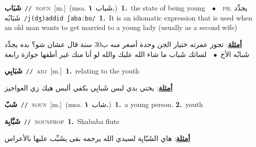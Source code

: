 \documentclass[10pt,a4paper,twoside]{article} %
\begin{document}
\begin{multicols}{2}
{\setlength\topsep{0pt}\textbf{\foreignlanguage{arabic}{شَبَاب}}\ {\color{gray}\texttt{//}\color{black}}\ \textsc{noun}\ [m.]\ \color{gray}(msa. \foreignlanguage{arabic}{شَباب}~\foreignlanguage{arabic}{\textbf{١.}})\color{black}\ \textbf{1.}~the state of being young\ \ $\bullet$\ \ \textsc{ph.} \color{gray} \foreignlanguage{arabic}{يجدِّد شَبَابُه}\color{black}\ {\color{gray}\texttt{/{\sffamily j(dʒ)addid ʃabaːbo}/}\color{black}}\ \textbf{1.}~It is an idiomatic expression that is used when an old man wants to get married to a young lady (usually as a second wife)\  \begin{flushright}\color{gray}\foreignlanguage{arabic}{\textbf{\underline{\foreignlanguage{arabic}{أمثلة}}}: تجوز عمرته ختيار الجن وحدة أصغر منه ب30 سنة قال عشان شو؟ بده يجدِّد شَبابُه الأخ\ $\bullet$\ \  لساتك شَباب ما شاء الله عليك والله لو أنا منك غير أطقها جوازة رابعة}\end{flushright}\color{black}} \vspace{2mm}

{\setlength\topsep{0pt}\textbf{\foreignlanguage{arabic}{شَبَابِي}}\ {\color{gray}\texttt{//}\color{black}}\ \textsc{adj}\ [m.]\ \textbf{1.}~relating to the youth\  \begin{flushright}\color{gray}\foreignlanguage{arabic}{\textbf{\underline{\foreignlanguage{arabic}{أمثلة}}}: يختي بدي لبس شَبابِي بكفي ألبس هيك زي العواجيز}\end{flushright}\color{black}} \vspace{2mm}

{\setlength\topsep{0pt}\textbf{\foreignlanguage{arabic}{شَبّ}}\ {\color{gray}\texttt{//}\color{black}}\ \textsc{noun}\ [m.]\ \color{gray}(msa. \foreignlanguage{arabic}{شاب}~\foreignlanguage{arabic}{\textbf{١.}})\color{black}\ \textbf{1.}~a young person.  \textbf{2.}~youth\ } \vspace{2mm}

{\setlength\topsep{0pt}\textbf{\foreignlanguage{arabic}{شَبَّابِة}}\ {\color{gray}\texttt{//}\color{black}}\ \textsc{noun\textunderscore prop}\ \textbf{1.}~Shababa flute\  \begin{flushright}\color{gray}\foreignlanguage{arabic}{\textbf{\underline{\foreignlanguage{arabic}{أمثلة}}}: هاي الشَبّابِة لسيدي الله يرحمه بقى  يشَبِّب عليها بالأعراس}\end{flushright}\color{black}} \vspace{2mm}


\end{multicols}
\end{document}
